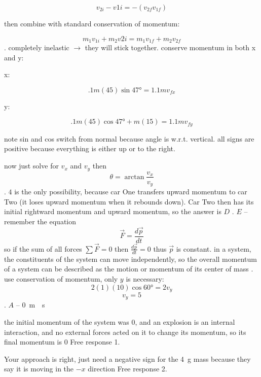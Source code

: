 \documentclass[]{article}
\begin{document}
$$ v_{2i}-v{1i} = -(v_{2f} v_{1f}) $$ 

then combine with standard conservation of momentum:

$$ m_1v_{1i} + m_2v{2i} = m_1v_{1f} + m_2v_{2f} $$ 
\newline
{}. completely inelastic $\rightarrow$ they will stick together. conserve momentum in both x and y:

x:

$$ .1m(45)\sin{\ang{47}} = 1.1mv_{fx} $$ 

y: 

$$ .1m(45)\cos{\ang{47}} + m(15) = 1.1mv_{fy} $$ 

note sin and cos switch from normal because angle is w.r.t. vertical. all signs are positive because everything is either up or to the right. 

now just solve for $v_x$ and $v_y$ then 
$$ \theta = \arctan{\frac{v_x}{v_y}} $$ 
\newline
{}. $4$ is the only possibility, because car One transfers upward momentum to car Two (it loses upward momentum when it rebounds down). Car Two then has its initial rightward momentum and upward momentum, so the answer is $D$
\newline
{}. $E$ -- remember the equation 
$$ \vec{F} = \frac{d\vec{p}}{dt} $$
so if the sum of all forces $\sum \vec{F} = 0 $ then $\frac{d\vec{p}}{dt} = 0 $ thus $\vec{p} $ is constant. in a system, the constituents of the system can move independently, so the overall momentum of a system can be described as the motion or momentum of its center of mass
\newline
{}. use conservation of momentum, only $y$ is necessary:
$$2(1)(10)\cos \ang{60} = 2v_y $$ 
$$ v_y = 5 $$ 
\newline
{}. $A$ -- \SI{0}{m \per s}

the initial momentum of the system was $0$, and an explosion is an internal interaction, and no external forces acted on it to change its momentum, so its final momentum is $0$
\newline
\newline
Free response 1. 

Your approach is right, just need a negative sign for the \SI{4}{g} mass because they say it is moving in the $-x$ direction
\newline
\newline
Free response 2. 
\end{document}
